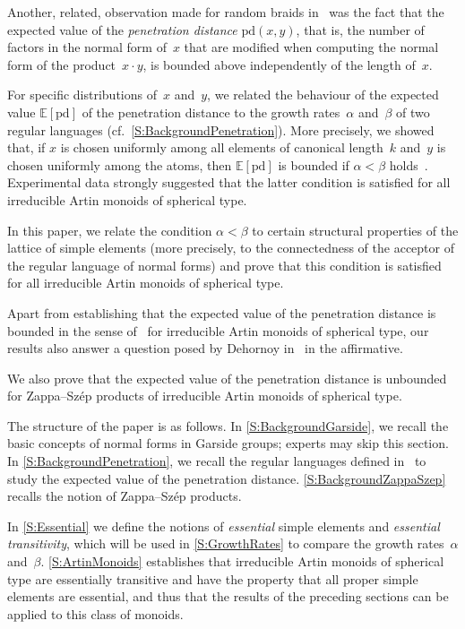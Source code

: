 \documentclass[a4paper,final]{article}
\theoremstyle{plain}
\theoremstyle{remark}
\theoremstyle{definition}
\begin{document}
Another, related, observation made for random braids in~\cite{GT13} was the fact that the expected value of the \emph{penetration distance} ${\mathrm{pd}}(x,y)$, that is, the number of factors in the normal form of~$x$ that are modified when computing the normal form of the product~$x\cdot y$, is bounded above independently of the length of~$x$.

For specific distributions of~$x$ and~$y$, we related the behaviour of the expected value ${\mathbb{E}}[{\mathrm{pd}}]$ of the penetration distance to the growth rates~$\alpha$ and~$\beta$ of two regular languages (cf.\ \autoref{S:BackgroundPenetration}).  
More precisely, we showed that, if $x$ is chosen uniformly among all elements of canonical length~$k$ and~$y$ is chosen uniformly among the atoms, then ${\mathbb{E}}[{\mathrm{pd}}]$ is bounded if $\alpha<\beta$ holds~\cite[Theorem~4.7]{GT13}.
Experimental data strongly suggested that the latter condition is satisfied for all irreducible Artin monoids of spherical type.
\medskip

In this paper, we relate the condition $\alpha<\beta$ to certain structural properties of the lattice of simple elements (more precisely, to the connectedness of the acceptor of the regular language of normal forms) and prove that this condition is satisfied for all irreducible Artin monoids of spherical type.

Apart from establishing that the expected value of the penetration distance is bounded in the sense of~\cite[Theorem~4.7]{GT13} for irreducible Artin monoids of spherical type, our results also answer a question posed by Dehornoy in~\cite{DehornoyJCTA07} in the affirmative.

We also prove that the expected value of the penetration distance is unbounded for {Zappa--Sz{\'e}p}{} products of 
irreducible Artin monoids of spherical type.
\medskip

The structure of the paper is as follows.
In \autoref{S:BackgroundGarside}, we recall the basic concepts of normal forms in Garside groups; experts may skip this section.
In \autoref{S:BackgroundPenetration}, we recall the regular languages defined in~\cite{GT13} to study the expected value of the penetration distance.
\autoref{S:BackgroundZappaSzep} recalls the notion of {Zappa--Sz{\'e}p}{} products.

In \autoref{S:Essential} we define the notions of \emph{essential} simple elements and \emph{essential transitivity}, which will be used in \autoref{S:GrowthRates} to compare the growth rates~$\alpha$ and~$\beta$.
\autoref{S:ArtinMonoids} establishes that irreducible Artin monoids of spherical type are essentially transitive and have the property that all proper simple elements are essential, and thus that the results of the preceding sections can be applied to this class of monoids.
\end{document}
